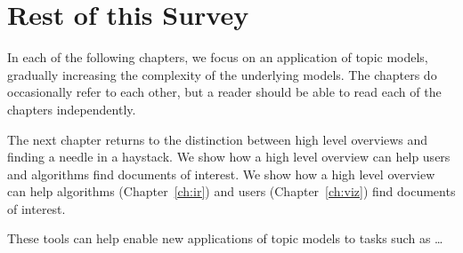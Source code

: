 \section{Rest of this Survey}


In each of the following chapters, we focus on an application of topic
models, gradually increasing the complexity of the underlying models.
The chapters do occasionally refer to each other, but a reader should
be able to read each of the chapters independently.

The next chapter returns to the distinction between high level
overviews and finding a needle in a haystack.  We show how a high
level overview can help users and algorithms find documents of
interest.  We show how a high level overview can help
algorithms (Chapter~\ref{ch:ir}) and users (Chapter~\ref{ch:viz}) find documents
of interest.

These tools can help enable new applications of topic models to tasks such as
\dots
